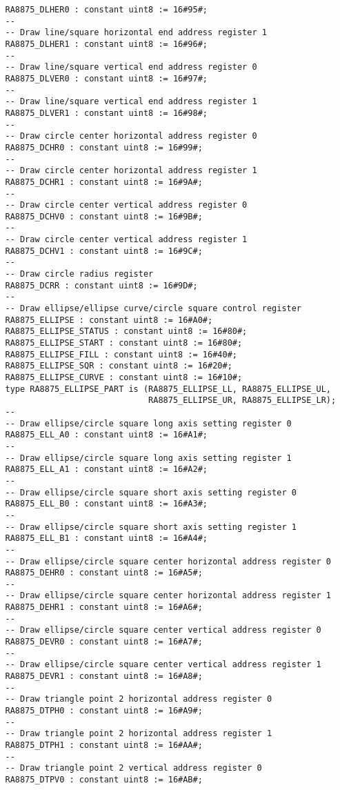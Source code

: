 \documentclass[10pt, openany]{book}
\begin{document}
\begin{lstlisting}
   RA8875_DLHER0 : constant uint8 := 16#95#;
   --
   -- Draw line/square horizontal end address register 1
   RA8875_DLHER1 : constant uint8 := 16#96#;
   --
   -- Draw line/square vertical end address register 0
   RA8875_DLVER0 : constant uint8 := 16#97#;
   --
   -- Draw line/square vertical end address register 1
   RA8875_DLVER1 : constant uint8 := 16#98#;
   --
   -- Draw circle center horizontal address register 0
   RA8875_DCHR0 : constant uint8 := 16#99#;
   --
   -- Draw circle center horizontal address register 1
   RA8875_DCHR1 : constant uint8 := 16#9A#;
   --
   -- Draw circle center vertical address register 0
   RA8875_DCHV0 : constant uint8 := 16#9B#;
   --
   -- Draw circle center vertical address register 1
   RA8875_DCHV1 : constant uint8 := 16#9C#;
   --
   -- Draw circle radius register
   RA8875_DCRR : constant uint8 := 16#9D#;
   --
   -- Draw ellipse/ellipse curve/circle square control register
   RA8875_ELLIPSE : constant uint8 := 16#A0#;
   RA8875_ELLIPSE_STATUS : constant uint8 := 16#80#;
   RA8875_ELLIPSE_START : constant uint8 := 16#80#;
   RA8875_ELLIPSE_FILL : constant uint8 := 16#40#;
   RA8875_ELLIPSE_SQR : constant uint8 := 16#20#;
   RA8875_ELLIPSE_CURVE : constant uint8 := 16#10#;
   type RA8875_ELLIPSE_PART is (RA8875_ELLIPSE_LL, RA8875_ELLIPSE_UL,
                                RA8875_ELLIPSE_UR, RA8875_ELLIPSE_LR);
   --
   -- Draw ellipse/circle square long axis setting register 0
   RA8875_ELL_A0 : constant uint8 := 16#A1#;
   --
   -- Draw ellipse/circle square long axis setting register 1
   RA8875_ELL_A1 : constant uint8 := 16#A2#;
   --
   -- Draw ellipse/circle square short axis setting register 0
   RA8875_ELL_B0 : constant uint8 := 16#A3#;
   --
   -- Draw ellipse/circle square short axis setting register 1
   RA8875_ELL_B1 : constant uint8 := 16#A4#;
   --
   -- Draw ellipse/circle square center horizontal address register 0
   RA8875_DEHR0 : constant uint8 := 16#A5#;
   --
   -- Draw ellipse/circle square center horizontal address register 1
   RA8875_DEHR1 : constant uint8 := 16#A6#;
   --
   -- Draw ellipse/circle square center vertical address register 0
   RA8875_DEVR0 : constant uint8 := 16#A7#;
   --
   -- Draw ellipse/circle square center vertical address register 1
   RA8875_DEVR1 : constant uint8 := 16#A8#;
   --
   -- Draw triangle point 2 horizontal address register 0
   RA8875_DTPH0 : constant uint8 := 16#A9#;
   --
   -- Draw triangle point 2 horizontal address register 1
   RA8875_DTPH1 : constant uint8 := 16#AA#;
   --
   -- Draw triangle point 2 vertical address register 0
   RA8875_DTPV0 : constant uint8 := 16#AB#;

\end{lstlisting}
\end{document}
